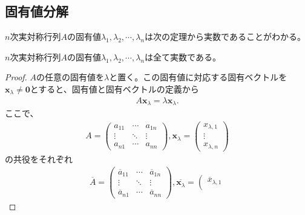 \subsection{固有値分解}
$n$次実対称行列$A$の固有値$\lambda_1, \lambda_2, \cdots, \lambda_n$は次の定理から実数であることがわかる。
\begin{theorem}
  $n$次実対称行列$A$の固有値$\lambda_1, \lambda_2, \cdots, \lambda_n$は全て実数である。
\end{theorem}
\begin{proof}
  $A$の任意の固有値を$\lambda$と置く。この固有値に対応する固有ベクトルを$\mathbf{x}_\lambda \not= \mathbf{0}$とすると、固有値と固有ベクトルの定義から
  \begin{align} \label{EigenEquation}
    A \mathbf{x}_\lambda = \lambda \mathbf{x}_\lambda.
  \end{align}
  ここで、
  \begin{align*}
    A = \left(
          \begin{array}{ccc}
            a_{1 1} & \cdots & a_{1 n} \\
            \vdots  & \ddots & \vdots \\
            a_{n 1} & \cdots & a_{n n}
          \end{array}
        \right),
    \mathbf{x}_\lambda = \left(
                           \begin{array}{c}
                             x_{\lambda, 1} \\
                             \vdots \\
                             x_{\lambda, n}
                           \end{array}
                         \right)
  \end{align*}
  の共役をそれぞれ
  \begin{align*}
    \overline{A} = \left(
                     \begin{array}{ccc}
                       \overline{a}_{1 1} & \cdots & \overline{a}_{1 n} \\
                       \vdots             & \ddots & \vdots \\
                       \overline{a}_{n 1} & \cdots & \overline{a}_{n n}
                     \end{array}
                   \right),
    \overline{\mathbf{x}_\lambda} = \left(
                                      \begin{array}{c}
                                        \overline{x}_{\lambda, 1} \\

\end{array}
\end{align*}
\end{proof}
